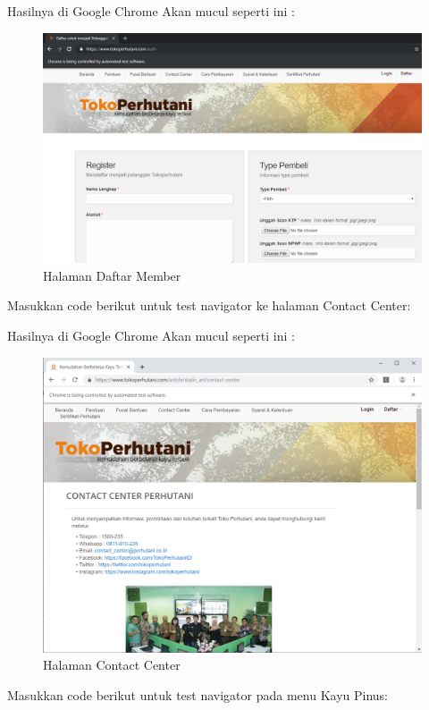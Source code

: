 Hasilnya  di Google Chrome Akan mucul seperti ini :
\begin{figure}[h]
	\centering
	\includegraphics[scale=0.33]{figures/3daftar}
	\caption{Halaman Daftar Member}
\end{figure}

Masukkan code berikut untuk test navigator ke halaman Contact Center:


Hasilnya  di Google Chrome Akan mucul seperti ini :
\begin{figure}[h]
	\centering
	\includegraphics[scale=0.3]{figures/4kontak}
	\caption{Halaman Contact Center}
\end{figure}

Masukkan code berikut untuk test navigator pada menu Kayu Pinus:


